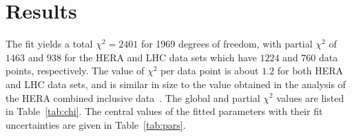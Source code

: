 \documentclass[12pt]{article}
\begin{document}
\section{Results}
\label{sec:results}

The fit yields a total $\chi^2 =2401$ for 1969 degrees of freedom, with partial $\chi^2$ of $1463$ and $938$ for the HERA and LHC data sets which have $1224$ and $760$ data points, respectively. The value
of $\chi^2$ per data point is about $1.2$ for both HERA and LHC data sets, and is similar in size to the value obtained in the analysis of the HERA combined inclusive data~\cite{Abramowicz:2015mha}. The global and partial $\chi^2$ values are listed in Table~\ref{tab:chi}. 
The central values of the fitted parameters with their fit uncertainties are given in Table~\ref{tab:pars}.
\end{document}
